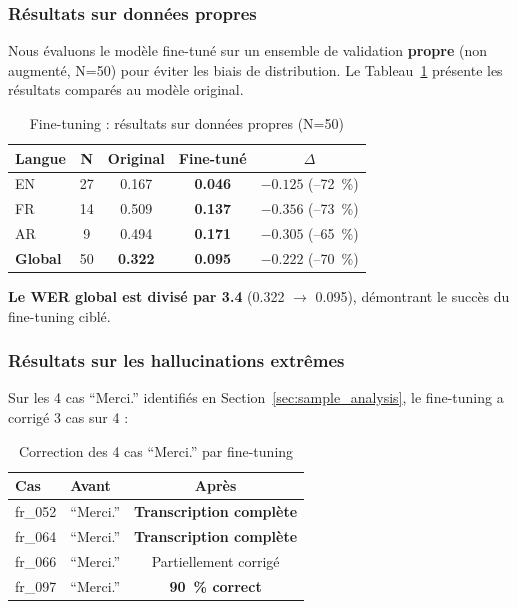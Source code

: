 \documentclass[11pt,a4paper]{article}
\begin{document}
\subsubsection{Résultats sur données propres}

Nous évaluons le modèle fine-tuné sur un ensemble de validation
\textbf{propre} (non augmenté, N=50) pour éviter les biais de distribution.
Le Tableau~\ref{tab:finetuning_results} présente les résultats comparés
au modèle original.

\begin{table}[h]
	\centering
	\caption{Fine-tuning : résultats sur données propres (N=50)}
	\label{tab:finetuning_results}
	\begin{tabular}{lcccc}
		\toprule
		\textbf{Langue} & \textbf{N} & \textbf{Original} & \textbf{Fine-tuné} & \textbf{$\Delta$} \\
		\midrule
		EN & 27 & 0.167 & \textbf{0.046} & $-0.125$ (--72~\%) \\
		FR & 14 & 0.509 & \textbf{0.137} & $-0.356$ (--73~\%) \\
		AR & 9  & 0.494 & \textbf{0.171} & $-0.305$ (--65~\%) \\
		\midrule
		\textbf{Global} & 50 & \textbf{0.322} & \textbf{0.095} & $-0.222$ (--70~\%) \\
		\bottomrule
	\end{tabular}
\end{table}

\textbf{Le WER global est divisé par 3.4} (0.322 $\to$ 0.095),
démontrant le succès du fine-tuning ciblé.

\subsubsection{Résultats sur les hallucinations extrêmes}

Sur les 4 cas ``Merci.'' identifiés en Section~\ref{sec:sample_analysis},
le fine-tuning a corrigé 3 cas sur 4 :

\begin{table}[h]
	\centering
	\caption{Correction des 4 cas ``Merci.'' par fine-tuning}
	\label{tab:merci_correction}
	\begin{tabular}{llc}
		\toprule
		\textbf{Cas} & \textbf{Avant} & \textbf{Après} \\
		\midrule
		fr\_052 & ``Merci.'' & \textbf{Transcription complète} \\
		fr\_064 & ``Merci.'' & \textbf{Transcription complète} \\
		fr\_066 & ``Merci.'' & Partiellement corrigé \\
		fr\_097 & ``Merci.'' & \textbf{90~\% correct} \\
		\bottomrule
	\end{tabular}
\end{table}
\end{document}
